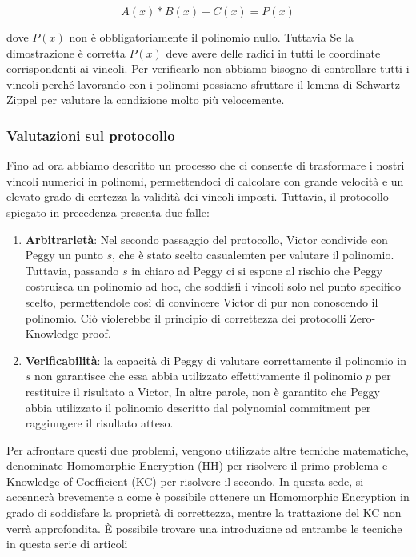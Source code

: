 \begin{enumerate}
    $$
    A(x)*B(x)-C(x)=P(x)
    $$
    
    dove $P(x)$ non è obbligatoriamente il polinomio nullo. Tuttavia Se la dimostrazione è corretta $P(x)$ deve avere delle
    radici in tutti le coordinate corrispondenti ai vincoli. Per verificarlo non abbiamo bisogno di controllare tutti i
    vincoli perché lavorando con i polinomi possiamo sfruttare il lemma di Schwartz-Zippel per valutare la condizione
    molto più velocemente.
\end{enumerate}
    
\subsubsection{Valutazioni sul protocollo}
Fino ad ora abbiamo descritto un processo che ci consente di trasformare i nostri vincoli numerici in polinomi,
permettendoci di calcolare con grande velocità e un elevato grado di certezza la validità dei vincoli imposti. Tuttavia,
il protocollo spiegato in precedenza presenta due falle:

\begin{enumerate}
    \item \textbf{Arbitrarietà}: Nel secondo passaggio del protocollo, Victor condivide con Peggy un punto $s$, che è stato scelto
    casualemten per valutare il polinomio. Tuttavia, passando $s$ in chiaro ad Peggy ci si espone al rischio che Peggy
    costruisca un polinomio ad hoc, che soddisfi i vincoli solo nel punto specifico scelto, permettendole così di convincere
    Victor di pur non conoscendo il polinomio. Ciò violerebbe il principio di correttezza dei protocolli Zero-Knowledge proof.
    \item \textbf{Verificabilità}: la capacità di Peggy di valutare correttamente il polinomio in $s$ non garantisce che essa abbia
    utilizzato effettivamente il polinomio $p$ per restituire il risultato a Victor, In altre parole, non è garantito che Peggy
    abbia utilizzato il polinomio descritto dal polynomial commitment per raggiungere il risultato atteso.
\end{enumerate}

Per affrontare questi due problemi, vengono utilizzate altre tecniche matematiche, denominate Homomorphic Encryption (HH) per
risolvere il primo problema e Knowledge of Coefficient (KC) per risolvere il secondo. In questa sede, si accennerà
brevemente a come è possibile ottenere un Homomorphic Encryption in grado di soddisfare la proprietà di correttezza,
mentre la trattazione del KC non verrà approfondita. È possibile trovare una introduzione ad entrambe le tecniche
in questa serie di articoli \cite{explaining_sanrks}

